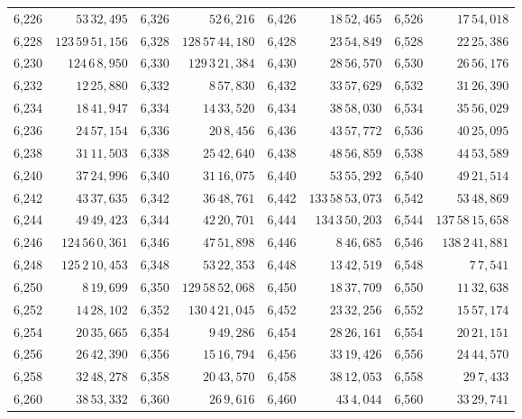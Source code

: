 \begin{tabular}{|r|r||r|r||r|r||r|r|}
6,226 & \(53\,32,\!495\) & 6,326 & \(52\,6,\!216\) & 6,426 & \(18\,52,\!465\) & 6,526 & \(17\,54,\!018\) \\
6,228 & \(123\,59\,51,\!156\) & 6,328 & \(128\,57\,44,\!180\) & 6,428 & \(23\,54,\!849\) & 6,528 & \(22\,25,\!386\) \\
6,230 & \(124\,6\,8,\!950\) & 6,330 & \(129\,3\,21,\!384\) & 6,430 & \(28\,56,\!570\) & 6,530 & \(26\,56,\!176\) \\[1pt]
6,232 & \(12\,25,\!880\) & 6,332 & \(8\,57,\!830\) & 6,432 & \(33\,57,\!629\) & 6,532 & \(31\,26,\!390\) \\
6,234 & \(18\,41,\!947\) & 6,334 & \(14\,33,\!520\) & 6,434 & \(38\,58,\!030\) & 6,534 & \(35\,56,\!029\) \\
6,236 & \(24\,57,\!154\) & 6,336 & \(20\,8,\!456\) & 6,436 & \(43\,57,\!772\) & 6,536 & \(40\,25,\!095\) \\
6,238 & \(31\,11,\!503\) & 6,338 & \(25\,42,\!640\) & 6,438 & \(48\,56,\!859\) & 6,538 & \(44\,53,\!589\) \\
6,240 & \(37\,24,\!996\) & 6,340 & \(31\,16,\!075\) & 6,440 & \(53\,55,\!292\) & 6,540 & \(49\,21,\!514\) \\[1pt]
6,242 & \(43\,37,\!635\) & 6,342 & \(36\,48,\!761\) & 6,442 & \(133\,58\,53,\!073\) & 6,542 & \(53\,48,\!869\) \\
6,244 & \(49\,49,\!423\) & 6,344 & \(42\,20,\!701\) & 6,444 & \(134\,3\,50,\!203\) & 6,544 & \(137\,58\,15,\!658\) \\
6,246 & \(124\,56\,0,\!361\) & 6,346 & \(47\,51,\!898\) & 6,446 & \(8\,46,\!685\) & 6,546 & \(138\,2\,41,\!881\) \\
6,248 & \(125\,2\,10,\!453\) & 6,348 & \(53\,22,\!353\) & 6,448 & \(13\,42,\!519\) & 6,548 & \(7\,7,\!541\) \\
6,250 & \(8\,19,\!699\) & 6,350 & \(129\,58\,52,\!068\) & 6,450 & \(18\,37,\!709\) & 6,550 & \(11\,32,\!638\) \\[1pt]
6,252 & \(14\,28,\!102\) & 6,352 & \(130\,4\,21,\!045\) & 6,452 & \(23\,32,\!256\) & 6,552 & \(15\,57,\!174\) \\
6,254 & \(20\,35,\!665\) & 6,354 & \(9\,49,\!286\) & 6,454 & \(28\,26,\!161\) & 6,554 & \(20\,21,\!151\) \\
6,256 & \(26\,42,\!390\) & 6,356 & \(15\,16,\!794\) & 6,456 & \(33\,19,\!426\) & 6,556 & \(24\,44,\!570\) \\
6,258 & \(32\,48,\!278\) & 6,358 & \(20\,43,\!570\) & 6,458 & \(38\,12,\!053\) & 6,558 & \(29\,7,\!433\) \\
6,260 & \(38\,53,\!332\) & 6,360 & \(26\,9,\!616\) & 6,460 & \(43\,4,\!044\) & 6,560 & \(33\,29,\!741\) \\[1pt]

\end{tabular}
